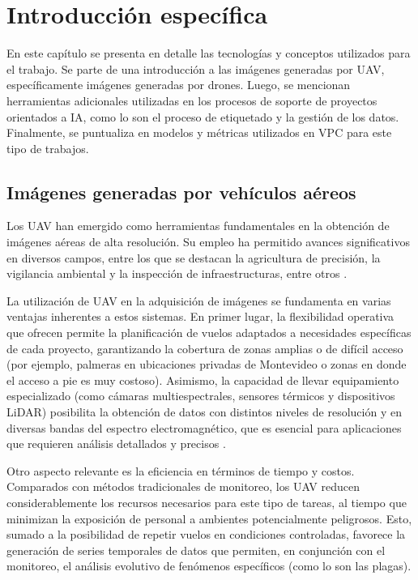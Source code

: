 \chapter{Introducción específica}
\label{Chapter2}

En este capítulo se presenta en detalle las tecnologías y conceptos utilizados para el trabajo. Se parte de una introducción a las imágenes generadas por UAV, específicamente imágenes generadas por drones. Luego, se mencionan herramientas adicionales utilizadas en los procesos de soporte de proyectos orientados a IA, como lo son el proceso de etiquetado y la gestión de los datos. Finalmente, se puntualiza en modelos y métricas utilizados en VPC para este tipo de trabajos.

\section{Imágenes generadas por vehículos aéreos}
\label{sec:imgUAV}

Los UAV han emergido como herramientas fundamentales en la obtención de imágenes aéreas de alta resolución. Su empleo ha permitido avances significativos en diversos campos, entre los que se destacan la agricultura de precisión, la vigilancia ambiental y la inspección de infraestructuras, entre otros \citep{mokhtar_image_2023}.

La utilización de UAV en la adquisición de imágenes se fundamenta en varias ventajas inherentes a estos sistemas. En primer lugar, la flexibilidad operativa que ofrecen permite la planificación de vuelos adaptados a necesidades específicas de cada proyecto, garantizando la cobertura de zonas amplias o de difícil acceso (por ejemplo, palmeras en ubicaciones privadas de Montevideo o zonas en donde el acceso a pie es muy costoso). Asimismo, la capacidad de llevar equipamiento especializado (como cámaras multiespectrales, sensores térmicos y dispositivos LiDAR) posibilita la obtención de datos con distintos niveles de resolución y en diversas bandas del espectro electromagnético, que es esencial para aplicaciones que requieren análisis detallados y precisos \citep{unmanned_system_technology_uavdrone_nodate}.

Otro aspecto relevante es la eficiencia en términos de tiempo y costos. Comparados con métodos tradicionales de monitoreo, los UAV reducen considerablemente los recursos necesarios para este tipo de tareas, al tiempo que minimizan la exposición de personal a ambientes potencialmente peligrosos. Esto, sumado a la posibilidad de repetir vuelos en condiciones controladas, favorece la generación de series temporales de datos que permiten, en conjunción con el monitoreo, el análisis evolutivo de fenómenos específicos (como lo son las plagas).

